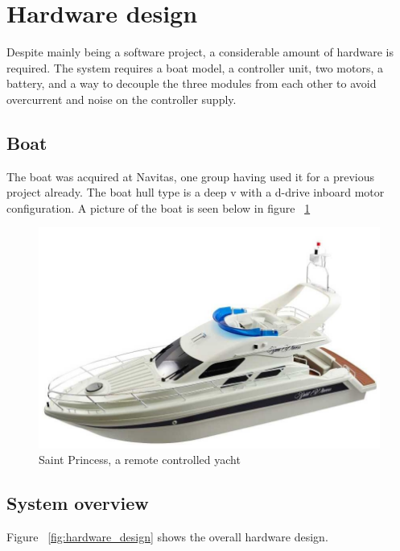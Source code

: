 \section{Hardware design}

Despite mainly being a software project, a considerable amount of hardware is required. The system requires a boat model, a controller unit, two motors, a battery, and a way to decouple the three modules from each other to avoid overcurrent and noise on the controller supply. 

\subsection{Boat}

The boat was acquired at Navitas, one group having used it for a previous project already. The boat hull type is a deep v with a d-drive inboard motor configuration. A picture of the boat is seen below in figure ~\ref{fig:saintprincess}

\begin{figure}[H]
\centering
\includegraphics[width=1\linewidth]{saint_princess}
\caption{Saint Princess, a remote controlled yacht}
\label{fig:saintprincess}
\end{figure}

\subsection{System overview}

Figure ~\ref{fig:hardware_design} shows the overall hardware design. 

